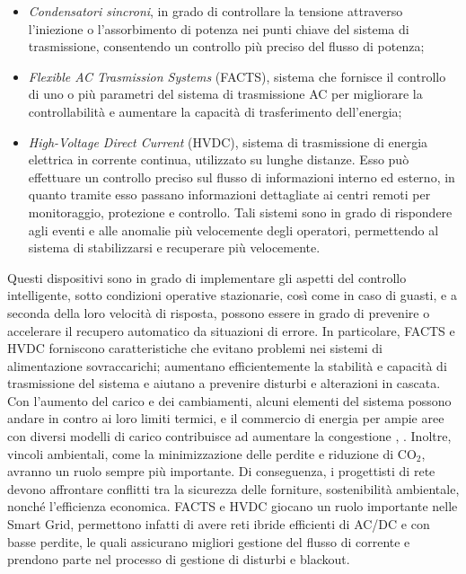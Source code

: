 \begin{itemize}
	\item \emph{Condensatori sincroni}, in grado di controllare la tensione attraverso l'iniezione o l'assorbimento di potenza nei punti chiave del sistema di trasmissione, consentendo un controllo più preciso del flusso di potenza;
	\item \emph{Flexible AC Trasmission Systems} (FACTS), sistema che fornisce il controllo di uno o più parametri del sistema di trasmissione AC per migliorare la controllabilità e aumentare la capacità di trasferimento dell'energia; 
	\item \emph{High-Voltage Direct Current} (HVDC), sistema di trasmissione di energia elettrica in corrente continua, utilizzato su lunghe distanze. Esso può effettuare un controllo preciso sul flusso di informazioni interno ed esterno, in quanto tramite esso passano informazioni dettagliate ai centri remoti per monitoraggio, protezione e controllo. Tali sistemi sono in grado di rispondere agli eventi e alle anomalie più velocemente degli operatori, permettendo al sistema di stabilizzarsi e recuperare più velocemente.
\end{itemize}
Questi dispositivi sono in grado di implementare gli aspetti del controllo intelligente, sotto condizioni operative stazionarie, così come in caso di guasti, e a seconda della loro velocità di risposta, possono essere in grado di prevenire o accelerare il recupero automatico da situazioni di errore. In particolare, FACTS e HVDC forniscono caratteristiche che evitano problemi nei sistemi di alimentazione sovraccarichi; aumentano efficientemente la stabilità e capacità di trasmissione del sistema e aiutano a prevenire disturbi e alterazioni in cascata. Con l'aumento del carico e dei cambiamenti, alcuni elementi del sistema possono andare in contro ai loro limiti termici, e il commercio di energia per ampie aree con diversi modelli di carico contribuisce ad aumentare la congestione \cite{tras1}, \cite{tras2}. Inoltre, vincoli ambientali, come la minimizzazione delle perdite e riduzione di CO$_2$, avranno un ruolo sempre più importante. Di conseguenza, i progettisti di rete devono affrontare conflitti tra la sicurezza delle forniture, sostenibilità ambientale, nonché l'efficienza economica. FACTS e HVDC giocano un ruolo importante nelle Smart Grid, permettono infatti di avere reti ibride efficienti di AC/DC e con basse perdite, le quali assicurano migliori gestione del flusso di corrente e prendono parte nel processo di gestione di disturbi e blackout.
\\ 
